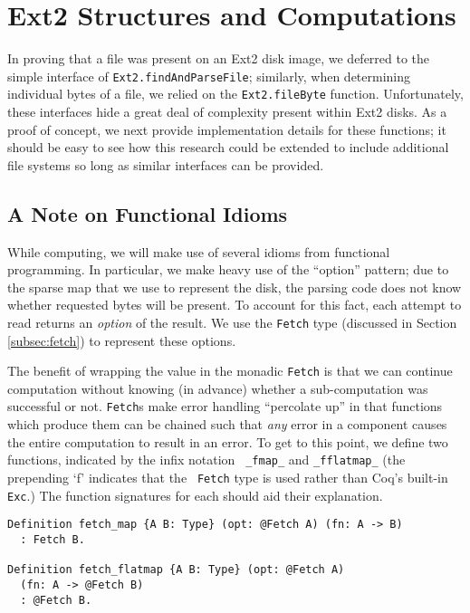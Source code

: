 \documentclass[nocopyrightspace]{sigplanconf}
\begin{document}
\section{Ext2 Structures and Computations}
\label{sec:ext2}

In proving that a file was present on an Ext2 disk image, we deferred to the
simple interface of {\tt Ext2.findAndParseFile}; similarly, when determining
individual bytes of a file, we relied on the {\tt Ext2.fileByte} function.
Unfortunately, these interfaces hide a great deal of complexity present within
Ext2 disks. As a proof of concept, we next provide implementation details for
these functions; it should be easy to see how this research could be extended
to include additional file systems so long as similar interfaces can be
provided.

\subsection{A Note on Functional Idioms}
\label{subsec:functionalext2}

While computing, we will make use of several idioms from functional
programming.  In particular, we make heavy use of the ``option'' pattern; due
to the sparse map that we use to represent the disk, the parsing code does not
know whether requested bytes will be present. To account for this fact, each
attempt to read returns an {\em option} of the result. We use the {\tt Fetch}
type (discussed in Section \ref{subsec:fetch}) to represent these options.

The benefit of wrapping the value in the monadic {\tt Fetch} is that we can
continue computation without knowing (in advance) whether a sub-computation
was successful or not. {\tt Fetch}s make error handling ``percolate up'' in
that functions which produce them can be chained such that {\em any} error
in a component causes the entire computation to result in an error. To get to
this point, we define two functions, indicated by the infix notation {\tt
\_fmap\_} and {\tt \_fflatmap\_} (the prepending `f' indicates that the {\tt
Fetch} type is used rather than Coq's built-in {\tt Exc}.) The function
signatures for each should aid their explanation.

\begin{lstlisting}
Definition fetch_map {A B: Type} (opt: @Fetch A) (fn: A -> B)
  : Fetch B.

Definition fetch_flatmap {A B: Type} (opt: @Fetch A) 
  (fn: A -> @Fetch B)
  : @Fetch B.
\end{lstlisting}
\end{document}
